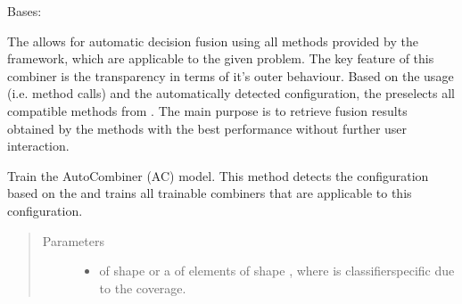 \documentclass[letterpaper,10pt,english]{sphinxmanual}
\begin{document}
\begin{fulllineitems}
\label{\detokenize{pusion.auto.auto_combiner:pusion.auto.auto_combiner.AutoCombiner}}
\sphinxAtStartPar
Bases: {\hyperref[\detokenize{pusion.auto.generic_combiner:pusion.auto.generic_combiner.GenericCombiner}]{}}

\sphinxAtStartPar
The  allows for automatic decision fusion using all methods provided by the framework, which are
applicable to the given problem. The key feature of this combiner is the transparency in terms of it’s outer
behaviour. Based on the usage (i.e. method calls) and the automatically detected configuration,
the  preselects all compatible methods from . The main purpose is to retrieve fusion
results obtained by the methods with the best performance without further user interaction.

\begin{fulllineitems}
\label{\detokenize{pusion.auto.auto_combiner:pusion.auto.auto_combiner.AutoCombiner.train}}
\sphinxAtStartPar
Train the AutoCombiner (AC) model. This method detects the configuration based on the  and
trains all trainable combiners that are applicable to this configuration.
\begin{quote}\begin{description}
\item[{Parameters}] \leavevmode\begin{itemize}
\item {} 
\sphinxAtStartPar
{} \textendash{} 
\sphinxAtStartPar
{} of shape  or a  of
 elements of shape , where  is classifier\sphinxhyphen{}specific
due to the coverage.


\end{itemize}
\end{description}
\end{quote}
\end{fulllineitems}
\end{fulllineitems}
\end{document}

